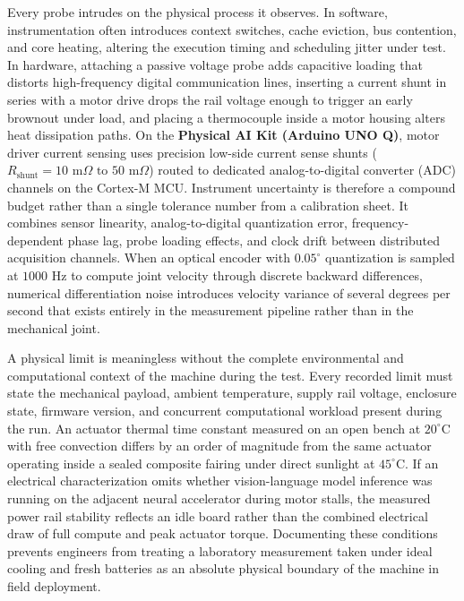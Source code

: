 \documentclass[
  letterpaper,
  DIV=11,
  numbers=noendperiod]{scrartcl}
\begin{document}
Every probe intrudes on the physical process it observes. In software,
instrumentation often introduces context switches, cache eviction, bus
contention, and core heating, altering the execution timing and
scheduling jitter under test. In hardware, attaching a passive voltage
probe adds capacitive loading that distorts high-frequency digital
communication lines, inserting a current shunt in series with a motor
drive drops the rail voltage enough to trigger an early brownout under
load, and placing a thermocouple inside a motor housing alters heat
dissipation paths. On the \textbf{Physical AI Kit (Arduino UNO Q)},
motor driver current sensing uses precision low-side current sense
shunts
(\(R_{\text{shunt}} = 10\text{ m}\Omega\text{ to }50\text{ m}\Omega\))
routed to dedicated analog-to-digital converter (ADC) channels on the
Cortex-M MCU. Instrument uncertainty is therefore a compound budget
rather than a single tolerance number from a calibration sheet. It
combines sensor linearity, analog-to-digital quantization error,
frequency-dependent phase lag, probe loading effects, and clock drift
between distributed acquisition channels. When an optical encoder with
\(0.05^\circ\) quantization is sampled at \(1000\text{ Hz}\) to compute
joint velocity through discrete backward differences, numerical
differentiation noise introduces velocity variance of several degrees
per second that exists entirely in the measurement pipeline rather than
in the mechanical joint.

A physical limit is meaningless without the complete environmental and
computational context of the machine during the test. Every recorded
limit must state the mechanical payload, ambient temperature, supply
rail voltage, enclosure state, firmware version, and concurrent
computational workload present during the run. An actuator thermal time
constant measured on an open bench at \(20^\circ\text{C}\) with free
convection differs by an order of magnitude from the same actuator
operating inside a sealed composite fairing under direct sunlight at
\(45^\circ\text{C}\). If an electrical characterization omits whether
vision-language model inference was running on the adjacent neural
accelerator during motor stalls, the measured power rail stability
reflects an idle board rather than the combined electrical draw of full
compute and peak actuator torque. Documenting these conditions prevents
engineers from treating a laboratory measurement taken under ideal
cooling and fresh batteries as an absolute physical boundary of the
machine in field deployment.
\end{document}
